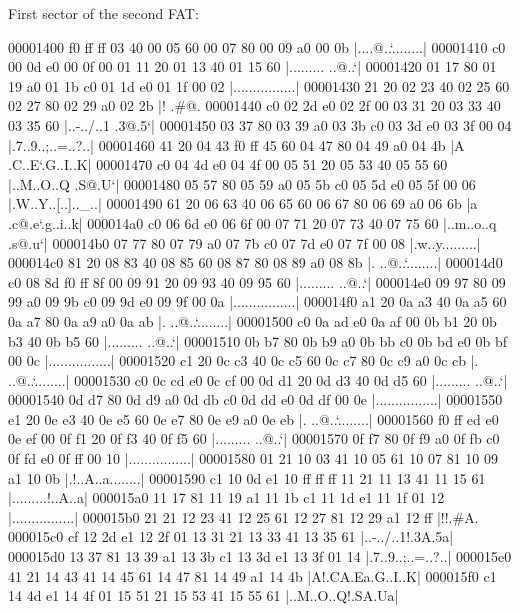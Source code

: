 \documentclass{article}
\begin{document}
    First sector of the second FAT:
    \begin{hexlsting}
        00001400  f0 ff ff 03 40 00 05 60  00 07 80 00 09 a0 00 0b  |....@..`........|
        00001410  c0 00 0d e0 00 0f 00 01  11 20 01 13 40 01 15 60  |......... ..@..`|
        00001420  01 17 80 01 19 a0 01 1b  c0 01 1d e0 01 1f 00 02  |................|
        00001430  21 20 02 23 40 02 25 60  02 27 80 02 29 a0 02 2b  |! .#@.%
        00001440  c0 02 2d e0 02 2f 00 03  31 20 03 33 40 03 35 60  |..-../..1 .3@.5`|
        00001450  03 37 80 03 39 a0 03 3b  c0 03 3d e0 03 3f 00 04  |.7..9..;..=..?..|
        00001460  41 20 04 43 f0 ff 45 60  04 47 80 04 49 a0 04 4b  |A .C..E`.G..I..K|
        00001470  c0 04 4d e0 04 4f 00 05  51 20 05 53 40 05 55 60  |..M..O..Q .S@.U`|
        00001480  05 57 80 05 59 a0 05 5b  c0 05 5d e0 05 5f 00 06  |.W..Y..[..].._..|
        00001490  61 20 06 63 40 06 65 60  06 67 80 06 69 a0 06 6b  |a .c@.e`.g..i..k|
        000014a0  c0 06 6d e0 06 6f 00 07  71 20 07 73 40 07 75 60  |..m..o..q .s@.u`|
        000014b0  07 77 80 07 79 a0 07 7b  c0 07 7d e0 07 7f 00 08  |.w..y..{..}.....|
        000014c0  81 20 08 83 40 08 85 60  08 87 80 08 89 a0 08 8b  |. ..@..`........|
        000014d0  c0 08 8d f0 ff 8f 00 09  91 20 09 93 40 09 95 60  |......... ..@..`|
        000014e0  09 97 80 09 99 a0 09 9b  c0 09 9d e0 09 9f 00 0a  |................|
        000014f0  a1 20 0a a3 40 0a a5 60  0a a7 80 0a a9 a0 0a ab  |. ..@..`........|
        00001500  c0 0a ad e0 0a af 00 0b  b1 20 0b b3 40 0b b5 60  |......... ..@..`|
        00001510  0b b7 80 0b b9 a0 0b bb  c0 0b bd e0 0b bf 00 0c  |................|
        00001520  c1 20 0c c3 40 0c c5 60  0c c7 80 0c c9 a0 0c cb  |. ..@..`........|
        00001530  c0 0c cd e0 0c cf 00 0d  d1 20 0d d3 40 0d d5 60  |......... ..@..`|
        00001540  0d d7 80 0d d9 a0 0d db  c0 0d dd e0 0d df 00 0e  |................|
        00001550  e1 20 0e e3 40 0e e5 60  0e e7 80 0e e9 a0 0e eb  |. ..@..`........|
        00001560  f0 ff ed e0 0e ef 00 0f  f1 20 0f f3 40 0f f5 60  |......... ..@..`|
        00001570  0f f7 80 0f f9 a0 0f fb  c0 0f fd e0 0f ff 00 10  |................|
        00001580  01 21 10 03 41 10 05 61  10 07 81 10 09 a1 10 0b  |.!..A..a........|
        00001590  c1 10 0d e1 10 ff ff ff  11 21 11 13 41 11 15 61  |.........!..A..a|
        000015a0  11 17 81 11 19 a1 11 1b  c1 11 1d e1 11 1f 01 12  |................|
        000015b0  21 21 12 23 41 12 25 61  12 27 81 12 29 a1 12 ff  |!!.#A.%
        000015c0  cf 12 2d e1 12 2f 01 13  31 21 13 33 41 13 35 61  |..-../..1!.3A.5a|
        000015d0  13 37 81 13 39 a1 13 3b  c1 13 3d e1 13 3f 01 14  |.7..9..;..=..?..|
        000015e0  41 21 14 43 41 14 45 61  14 47 81 14 49 a1 14 4b  |A!.CA.Ea.G..I..K|
        000015f0  c1 14 4d e1 14 4f 01 15  51 21 15 53 41 15 55 61  |..M..O..Q!.SA.Ua|
    \end{hexlsting}
\end{document}
